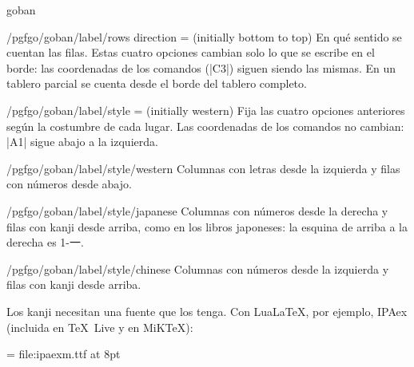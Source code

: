 \begin{environment}{{goban}}
	\begin{key}{/pgfgo/goban/label/rows direction =  (initially bottom to top)}
		En qué sentido se cuentan las filas. Estas cuatro opciones cambian solo lo que se escribe en el borde: las coordenadas de los comandos (|C3|) siguen siendo las mismas. En un tablero parcial se cuenta desde el borde del tablero completo.

		\begin{codeexample}[]
			\begin{goban}[5, label = {at = {north, west}, columns = numbers,
				rows direction = top to bottom}]
			\end{goban}
		\end{codeexample}
	\end{key}

	\begin{key}{/pgfgo/goban/label/style =  (initially western)}
		Fija las cuatro opciones anteriores según la costumbre de cada lugar. Las coordenadas de los comandos no cambian: |A1| sigue abajo a la izquierda.

		\begin{stylekey}{/pgfgo/goban/label/style/western}
			Columnas con letras desde la izquierda y filas con números desde abajo.
		\end{stylekey}

		\begin{stylekey}{/pgfgo/goban/label/style/japanese}
			Columnas con números desde la derecha y filas con kanji desde arriba, como en los libros japoneses: la esquina de arriba a la derecha es 1-{\pgfgokanji 一}.
		\end{stylekey}

		\begin{stylekey}{/pgfgo/goban/label/style/chinese}
			Columnas con números desde la izquierda y filas con kanji desde arriba.
		\end{stylekey}

		Los kanji necesitan una fuente que los tenga. Con Lua\LaTeX, por ejemplo, IPAex (incluida en \TeX\ Live y en MiK\TeX):

		\begin{codeexample}[]
			\font\kanji = {file:ipaexm.ttf} at 8pt
			\begin{goban}[9, label = {at = {north, east}, style = japanese, font = \kanji}]
			\end{goban}
		\end{codeexample}
	\end{key}


\end{environment}
